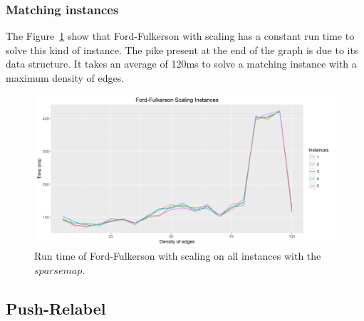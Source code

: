 \subsubsection{Matching instances}
The Figure~\ref{fig:ffmatching} show that Ford-Fulkerson with scaling has a constant run time to solve this kind of instance. The pike present at the end of the graph is due to its data structure. It takes an average of 120ms to solve a matching instance with a maximum density of edges.
\begin{figure}[H]
\begin{center}
\includegraphics[scale=0.5]{images/ffmatching.png}
\caption{Run time of Ford-Fulkerson with scaling on all instances with the $sparse map$.}
\label{fig:ffmatching}
\end{center}
\end{figure}
\subsection{Push-Relabel}
